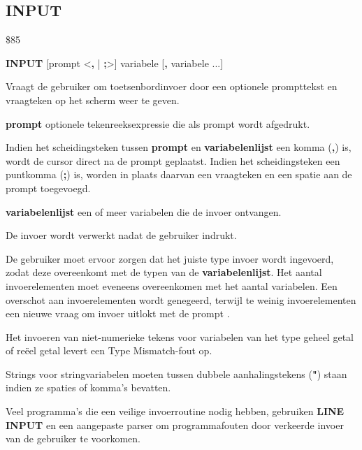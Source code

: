 
\newpage
\subsection{INPUT}
\begin{description}[leftmargin=2cm,style=nextline]
\item [Token:]    \$85

\item [Formaat:]   {\bf INPUT} [prompt <{\bf,} | {\bf;}>] variabele [{\bf,} variabele ...]

\item [Gebruik:]    Vraagt de gebruiker om toetsenbordinvoer door een optionele prompttekst en vraagteken op het scherm weer te geven.

                  {\bf prompt} optionele tekenreeksexpressie die als prompt wordt afgedrukt.

                  Indien het scheidingsteken tussen {\bf prompt} en {\bf variabelenlijst} een komma ({\bf ,}) is, wordt de cursor direct na de prompt geplaatst. Indien het scheidingsteken een puntkomma ({\bf ;}) is, worden in plaats daarvan een vraagteken en een spatie aan de prompt toegevoegd.

                  {\bf variabelenlijst} een of meer variabelen die de invoer ontvangen.

                  De invoer wordt verwerkt nadat de gebruiker  indrukt.

\item [Opmerkingen:]  De gebruiker moet ervoor zorgen dat het juiste type invoer wordt ingevoerd, zodat deze overeenkomt met de typen van de {\bf variabelenlijst}. Het aantal invoerelementen moet eveneens overeenkomen met het aantal variabelen. Een overschot aan invoerelementen wordt genegeerd, terwijl te weinig invoerelementen een nieuwe vraag om invoer uitlokt met de prompt .

                  Het invoeren van niet-numerieke tekens voor variabelen van het type geheel getal of reëel getal levert een Type Mismatch-fout op.

                  Strings voor stringvariabelen moeten tussen dubbele aanhalingstekens ({\bf "}) staan indien ze spaties of komma's bevatten.

                  Veel programma's die een veilige invoerroutine nodig hebben, gebruiken {\bf LINE INPUT} en een aangepaste parser om programmafouten door verkeerde invoer van de gebruiker te voorkomen.


\end{description}
